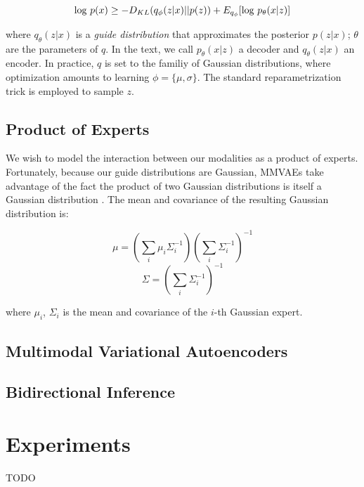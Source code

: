 \documentclass{article}
\begin{document}
\begin{equation}
    \textup{log } p(x) \geq -D_{KL}(q_{\phi}(z | x) || p(z)) + E_{q_{\phi}}[\textup{log } p_{\theta}(x | z)]
\end{equation}

where $q_{\theta}(z | x)$ is a \textit{guide distribution} that approximates the posterior $p(z | x)$; $\theta$ are the parameters of $q$. In the text, we call $p_{\theta}(x | z)$ a decoder and $q_{\theta}(z | x)$ an encoder. In practice, $q$ is set to the familiy of Gaussian distributions, where optimization amounts to learning $\phi=\{\mu, \sigma\}$. The standard reparametrization trick is employed to sample $z$.

\subsection{Product of Experts}

We wish to model the interaction between our modalities as a product of experts. Fortunately, because our guide distributions are Gaussian, MMVAEs take advantage of the fact the product of two Gaussian distributions is itself a Gaussian distribution \cite{cao2014generalized}. The mean and covariance of the resulting Gaussian distribution is:

\begin{equation}
    \mu = (\sum_{i} \mu_{i}\Sigma^{-1}_{i})(\sum_{i}\Sigma^{-1}_{i})^{-1}
\end{equation}
\begin{equation}
    \Sigma = (\sum_{i} \Sigma^{-1}_{i})^{-1}
\end{equation}

where $\mu_{i}$, $\Sigma_{i}$ is the mean and covariance of the $i$-th Gaussian expert.

\subsection{Multimodal Variational Autoencoders}
\subsection{Bidirectional Inference}

\section{Experiments}
TODO


{\small
\linespread{1}

}
\end{document}
